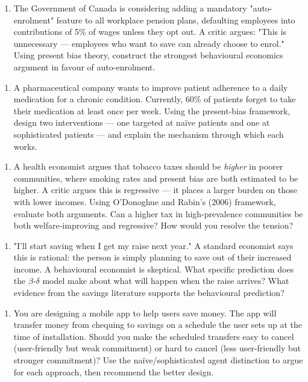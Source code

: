 \documentclass[12pt, letterpaper]{article}
\begin{document}
\begin{enumerate}
\item The Government of Canada is considering adding a mandatory "auto-enrolment" feature to all workplace pension plans, defaulting employees into contributions of 5\% of wages unless they opt out. A critic argues: "This is unnecessary --- employees who want to save can already choose to enrol." Using present bias theory, construct the strongest behavioural economics argument in favour of auto-enrolment.
\end{enumerate}

\begin{enumerate}
\item A pharmaceutical company wants to improve patient adherence to a daily medication for a chronic condition. Currently, 60\% of patients forget to take their medication at least once per week. Using the present-bias framework, design two interventions --- one targeted at naïve patients and one at sophisticated patients --- and explain the mechanism through which each works.
\end{enumerate}

\begin{enumerate}
\item A health economist argues that tobacco taxes should be \textit{higher} in poorer communities, where smoking rates and present bias are both estimated to be higher. A critic argues this is regressive --- it places a larger burden on those with lower incomes. Using O'Donoghue and Rabin's (2006) framework, evaluate both arguments. Can a higher tax in high-prevalence communities be both welfare-improving and regressive? How would you resolve the tension?
\end{enumerate}

\begin{enumerate}
\item "I'll start saving when I get my raise next year." A standard economist says this is rational: the person is simply planning to save out of their increased income. A behavioural economist is skeptical. What specific prediction does the $\beta$-$\delta$ model make about what will happen when the raise arrives? What evidence from the savings literature supports the behavioural prediction?
\end{enumerate}

\begin{enumerate}
\item You are designing a mobile app to help users save money. The app will transfer money from chequing to savings on a schedule the user sets up at the time of installation. Should you make the scheduled transfers easy to cancel (user-friendly but weak commitment) or hard to cancel (less user-friendly but stronger commitment)? Use the naïve/sophisticated agent distinction to argue for each approach, then recommend the better design.
\end{enumerate}
\end{document}
